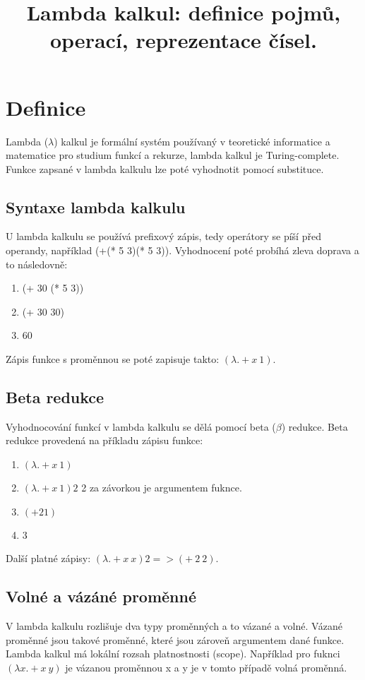 \documentclass{szzclass}
\title{Lambda kalkul: definice pojmů, operací, reprezentace čísel.}
\begin{document}
\maketitle


\section{Definice}

Lambda ($\lambda$) kalkul je formální systém používaný v teoretické informatice a matematice pro studium funkcí a rekurze, lambda kalkul je Turing-complete.
Funkce zapsané v lambda kalkulu lze poté vyhodnotit pomocí substituce. 

\subsection{Syntaxe lambda kalkulu}

U lambda kalkulu se používá prefixový zápis, tedy operátory se píší před operandy, například (+(* 5 3)(* 5 3)).
Vyhodnocení poté probíhá zleva doprava a to následovně:
\begin{enumerate}
    \item (+ 30 (* 5 3))
    \item (+ 30 30)
    \item 60
\end{enumerate}

Zápis funkce s proměnnou se poté zapisuje takto: $(\lambda . + x\ 1)$.

\subsection{Beta redukce}

Vyhodnocování funkcí v lambda kalkulu se dělá pomocí beta ($\beta$) redukce.
Beta redukce provedená na příkladu zápisu funkce:
\begin{enumerate}
    \item $(\lambda . + x\ 1)$
    \item $(\lambda . + x\ 1)2$
          2 za závorkou je argumentem fuknce.
    \item $(+ 2 1)$
    \item 3
\end{enumerate}

Další platné zápisy: $(\lambda . + x\ x) 2 => (+\ 2\ 2)$.

\subsection{Volné a vázáné proměnné}

V lambda kalkulu rozlišuje dva typy proměnných a to vázané a volné. Vázané proměnné jsou takové proměnné, které jsou zároveň argumentem
dané funkce. Lambda kalkul má lokální rozsah platnostnosti (scope).
Například pro fuknci $(\lambda x . + x\ y)$ je vázanou proměnnou x a y je v tomto případě volná proměnná.
\end{document}
